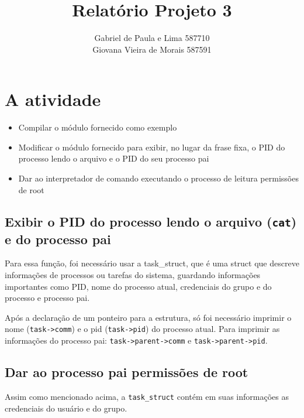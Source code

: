 \documentclass[12pt]{article}
\author{Gabriel de Paula e Lima  587710\\
        Giovana Vieira de Morais  587591}
\title{Relatório Projeto 3}
\begin{document}
\maketitle
\newpage

\section*{A atividade}

\begin{itemize}
    \item{Compilar o módulo fornecido como exemplo}
    \item{Modificar o módulo fornecido para exibir, no lugar da frase fixa,
    o PID do processo lendo o arquivo e o PID do seu processo pai}
    \item{Dar ao interpretador de comando executando o processo de leitura
        permissões de root}
\end{itemize}

\subsection*{Exibir o PID do processo lendo o arquivo (\texttt{cat}) e do
processo pai}
    Para essa função, foi necessário usar a task\_struct, que é uma struct que
    descreve informações de processos ou tarefas do sistema, guardando
    informações importantes como PID, nome do processo atual, credenciais do
    grupo e do processo e processo pai.

    Após a declaração de um ponteiro para a estrutura, só foi necessário
    imprimir o nome (\texttt{task->comm}) e o pid (\texttt{task->pid}) do
    processo atual. Para imprimir as informações do processo pai:
    \texttt{task->parent->comm} e \texttt{task->parent->pid}.
\subsection*{Dar ao processo pai permissões de root}
    Assim como mencionado acima, a \texttt{task\_struct} contém em suas
    informações as credenciais do usuário e do grupo.
\end{document}
